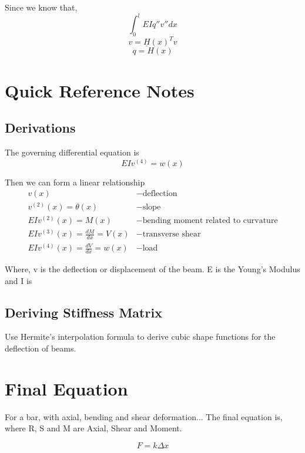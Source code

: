 \documentclass{report}
\begin{document}
Since we know that,
$$
\int_0^l EIq''v''dx
$$
$$
v = \underline{H}(x)^T v
$$
$$
q = H(x)
$$

\section{Quick Reference Notes}
\subsection{Derivations}
The governing differential equation is 
\[
  EI v^{(4)} = w(x)
\]

Then we can form a linear relationship
\begin{align*}
  v(x) & - \text{deflection} \\
  v^{(2)}(x) = \theta(x) & - \text{slope} \\
  EIv^{(2)}(x) = M(x) & - \text{bending moment related to curvature} \\
  EIv^{(3)}(x) = \frac{dM}{dx} = V(x) & - \text{transverse shear} \\ 
  EIv^{(4)}(x) = \frac{dV}{dx} = w(x) & - \text{load}
\end{align*}

Where, v is the deflection or displacement of the beam. E is the Young's Modulus and I is 

\subsection{Deriving Stiffness Matrix}
Use Hermite's interpolation formula to derive cubic shape functions for the deflection of beams.

\section{Final Equation}
For a bar, with axial, bending and shear deformation... The final equation is, where R, S and M are Axial, Shear and Moment.

\[
  F = k\Delta x
\]
\end{document}
